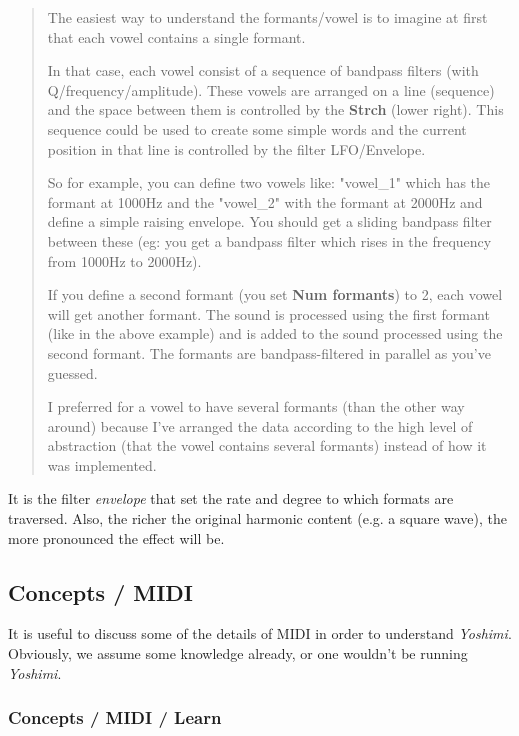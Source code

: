    \begin{quotation}
      The easiest way to understand the formants/vowel is to imagine at first
      that each vowel contains a single formant.

      In that case, each vowel consist of a sequence of bandpass filters (with
      Q/frequency/amplitude). These vowels are arranged on a line (sequence) and
      the space between them is controlled by the \textbf{Strch} (lower right).
      This sequence could be used to create some simple words and the current
      position in that line is controlled by the filter LFO/Envelope.

      So for example, you can define two vowels like: "vowel\_1" which has the
      formant at 1000Hz and the "vowel\_2" with the formant at 2000Hz and define
      a simple raising envelope. You should get a sliding bandpass filter between
      these (eg: you get a bandpass filter which rises in the frequency from
      1000Hz to 2000Hz).

      If you define a second formant (you set \textbf{Num formants}) to 2, each
      vowel will get another formant.  The sound is processed using the first
      formant (like in the above example) and is added to the sound processed
      using the second formant. The formants are bandpass-filtered in parallel
      as you've guessed.

      I preferred for a vowel to have several formants (than the other way
      around) because I've arranged the data according to the high level of
      abstraction (that the vowel contains several formants) instead of how it
      was implemented.
   \end{quotation}

   It is the filter \textsl{envelope} that set the rate and degree to which
   formats are traversed.
   Also, the richer the original harmonic content (e.g. a square wave), the more
   pronounced the effect will be.

\subsection{Concepts / MIDI}
\label{subsec:concepts_midi}

   It is useful to discuss some of the details of MIDI in order
   to understand \textsl{Yoshimi}.  Obviously, we assume
   some knowledge already, or one wouldn't be running
   \textsl{Yoshimi}.

\subsubsection{Concepts / MIDI / Learn}
\label{subsubsec:concepts_midi_learn}


